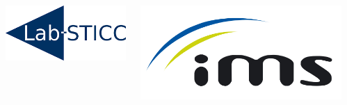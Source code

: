 \documentclass[hidelinks, french, xcolor={table, rgb, dvipsnames, x11names}, aspectratio=169, professionalfonts]{beamer}
\begin{document}
\begin{frame}
\begin{columns}
\begin{column}{.6\linewidth}
\begin{columns}
\begin{column}{.13\linewidth}
        \end{column}
        \begin{column}{.13\linewidth} \centering
          \includegraphics[width=\linewidth]{labsticc.png}
        \end{column}
        \begin{column}{.13\linewidth} \centering
          \includegraphics[width=\linewidth]{logoimsjoom.png}
        \end{column}


\end{columns}
\end{column}
\end{columns}
\end{frame}
\end{document}
